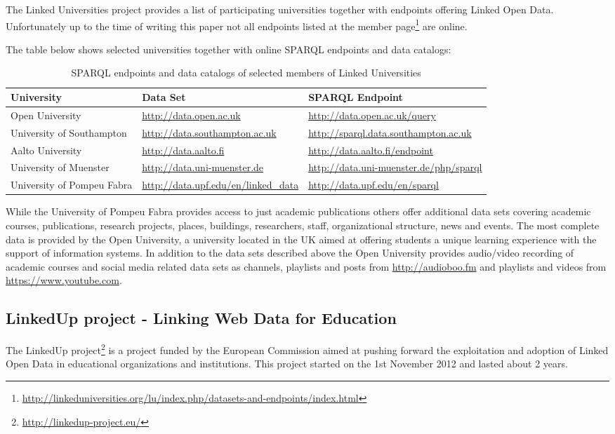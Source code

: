 \documentclass{article}
\begin{document}
The Linked Universities project provides a list of participating universities together with endpoints offering Linked Open Data. 
Unfortunately up to the time of writing this paper not all endpoints listed at the member page\footnote{\label{LOD_endpoints}\url{http://linkeduniversities.org/lu/index.php/datasets-and-endpoints/index.html}} are online. 

The table below shows selected universities together with online SPARQL endpoints and data catalogs: 

\begin{table}[H]
	\begin{tabularx}{\textwidth}{l|X|X}
		University & Data Set & SPARQL Endpoint \\
		\hline
		Open University & \url{http://data.open.ac.uk} & \url{http://data.open.ac.uk/query}\\
		University of Southampton & \url{http://data.southampton.ac.uk} & \url{http://sparql.data.southampton.ac.uk}\\
		Aalto University & \url{http://data.aalto.fi} & \url{http://data.aalto.fi/endpoint}\\
		University of Muenster & \url{http://data.uni-muenster.de} & \url{http://data.uni-muenster.de/php/sparql}\\
		University of Pompeu Fabra & \url{http://data.upf.edu/en/linked_data} & \url{http://data.upf.edu/en/sparql}\\
	\end{tabularx}
	\caption{SPARQL endpoints and data catalogs of selected members of Linked Universities}
	\label{table:sparql_data_catalog_linked_universities}
\end{table}

While the University of Pompeu Fabra provides access to just academic publications others offer additional data sets covering academic 
courses, publications, research projects, places,  buildings, researchers,  staff, organizational structure, news and events. The most
complete data is provided by the Open University, a university located in the UK aimed at offering students a unique learning experience with
the support of information systems. In addition to the data sets described above the Open University provides audio/video recording of academic courses 
and social media related data sets as channels, playlists and posts from \url{http://audioboo.fm} and playlists and videos from \url{https://www.youtube.com}. 

\subsection{LinkedUp project - Linking Web Data for Education}
\label{sec:linkedup}
The LinkedUp project\footnote{\url{http://linkedup-project.eu/}} is a project funded by the European Commission aimed at pushing forward the exploitation and adoption of Linked Open Data in educational organizations and institutions. This project started on the 1st November 2012 and lasted about 2 years. 
\end{document}
